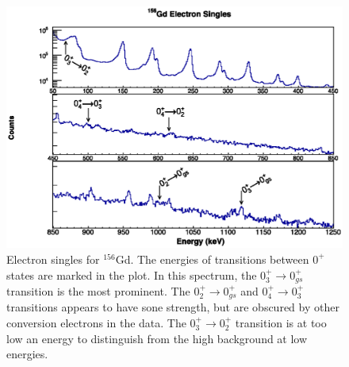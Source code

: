 \begin{figure}
    \centering
    \includegraphics[scale=0.8]{156GdTablesAndFigs/156Gd_Singles_Electron_Label.eps}
    \caption{Electron singles for $^{156}$Gd. The energies of transitions between $0^+$ states are marked in the plot. In this spectrum, the $0^+_{3}\rightarrow 0^+_{gs}$ transition is the most prominent. The $0^+_{2}\rightarrow 0^+_{gs}$ and $0^+_{4}\rightarrow 0^+_{3}$ transitions appears to have sone strength, but are obscured by other conversion electrons in the data. The $0^+_{3}\rightarrow 0^+_{2}$ transition is at too low an energy to distinguish from the high background at low energies.}
    \label{fig:156_e_singles}
\end{figure}